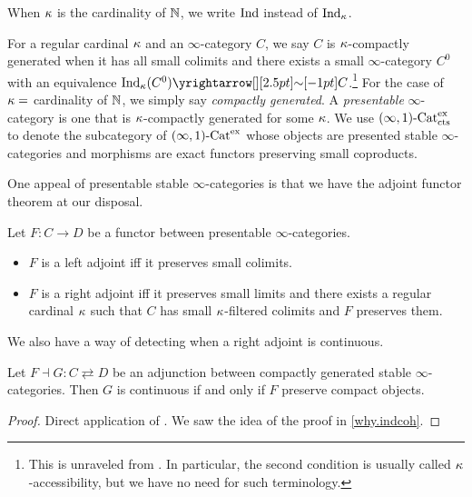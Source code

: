 \documentclass[./main.tex]{subfiles}
\begin{document}
\begin{prop}
\begin{itemize}
  \end{itemize}

  When $\kappa$ is the cardinality of $\mathbb{N}$,
  we write $\mathrm{Ind}$ instead of $\mathrm{Ind}_\kappa$.
\end{prop}

For a regular cardinal $\kappa$ and an $\infty$-category $C$,
we say $C$ is $\kappa$-compactly generated when
it has all small colimits and there exists a small $\infty$-category
$C^0$ with an equivalence $\IND_\ka(C^0) \map{\sim}{} C$.\footnote{
  This is unraveled from 
  \cite[Def 5.5.7.1]{Lurie-HTT}
  \cite[Def 5.5.0.18]{Lurie-HTT}
  \cite[Def 5.4.2.1]{Lurie-HTT}.
  In particular, the second condition is usually called 
  $\kappa$-accessibility, but we have no need for such terminology.
}
For the case of $\kappa =$ cardinality of $\mathbb{N}$,
we simply say \emph{compactly generated}.
A \emph{presentable} $\infty$-category is one that is
$\kappa$-compactly generated for some $\kappa$.
We use $(\infty,1)\text{-}\mathrm{Cat}^{\mathrm{ex}}_{\mathrm{cts}}$ to denote
the subcategory of $(\infty,1)\text{-}\mathrm{Cat}^{\mathrm{ex}}$ whose objects are
presented stable $\infty$-categories and morphisms are
exact functors preserving small coproducts.

One appeal of presentable stable $\infty$-categories is that
we have the adjoint functor theorem at our disposal.
\begin{prop}
  
  Let $F : C \to D$ be a functor between presentable $\infty$-categories.
  \begin{itemize}
    \item $F$ is a left adjoint iff it preserves small colimits.
    \item $F$ is a right adjoint iff it preserves small limits and
    there exists a regular cardinal $\kappa$ such that
    $C$ has small $\kappa$-filtered colimits and $F$ preserves them.
  \end{itemize}
  \cite[Prop 5.5.2.9]{Lurie-HTT}
\end{prop}
We also have a way of detecting when a right adjoint is continuous.
\begin{prop}
  
  Let $F \dashv G : C \rightleftarrows D$ be an adjunction between 
  compactly generated stable $\infty$-categories.
  Then $G$ is continuous if and only if $F$ preserve compact objects.
\end{prop}
\begin{proof}
  Direct application of \cite[Prop 5.5.7.2]{Lurie-HTT}.
  We saw the idea of the proof in \ref{why.indcoh}.
\end{proof}
\end{document}
